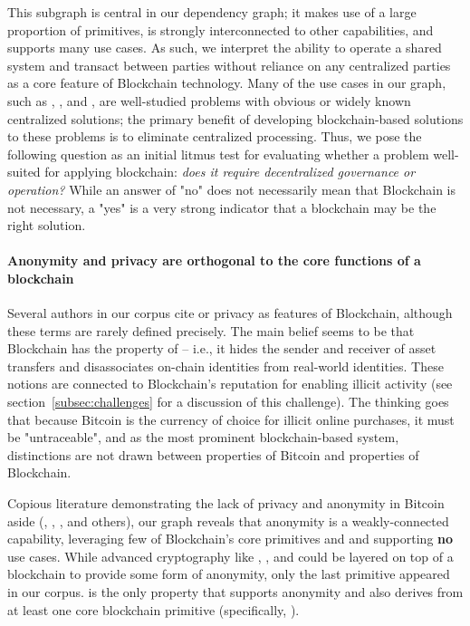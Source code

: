 {This subgraph is central in our dependency graph; it makes use of a large proportion of primitives, is strongly interconnected to other capabilities, and supports many use cases. As such, we interpret the ability to operate a shared system and transact between parties without reliance on any centralized parties as a core feature of Blockchain technology. Many of the use cases in our graph, such as , , and , are well-studied problems with obvious or widely known centralized solutions; the primary benefit of developing blockchain-based solutions to these problems is to eliminate centralized processing. Thus, we pose the following question as an initial litmus test for evaluating whether a problem well-suited for applying blockchain: \textit{does it require decentralized governance or operation?} While an answer of "no" does not necessarily mean that Blockchain is not necessary, a "yes" is a very strong indicator that a blockchain may be the right solution.

\paragraph{Anonymity and privacy are orthogonal to the core functions of a blockchain}
Several authors in our corpus cite  or privacy as features of Blockchain, although these terms are rarely defined precisely. The main belief seems to be that Blockchain has the property of  -- i.e., it hides the sender and receiver of asset transfers and disassociates on-chain identities from real-world identities. These notions are connected to Blockchain's reputation for enabling illicit activity (see section~\ref{subsec:challenges} for a discussion of this challenge). The thinking goes that because Bitcoin is the currency of choice for illicit online purchases, it must be "untraceable", and as the most prominent blockchain-based system, distinctions are not drawn between properties of Bitcoin and properties of Blockchain.

Copious literature demonstrating the lack of privacy and anonymity in Bitcoin aside (\cite{Goldfeder17}, \cite{Conti17}, \cite{Androulaki13}, and others), our graph reveals that anonymity is a weakly-connected capability, leveraging few of Blockchain's core primitives and and supporting \textbf{no} use cases. While advanced cryptography like , , and  could be layered on top of a blockchain to provide some form of anonymity, only the last primitive appeared in our corpus.  is the only property that supports anonymity and also derives from at least one core blockchain primitive (specifically, ).

}

